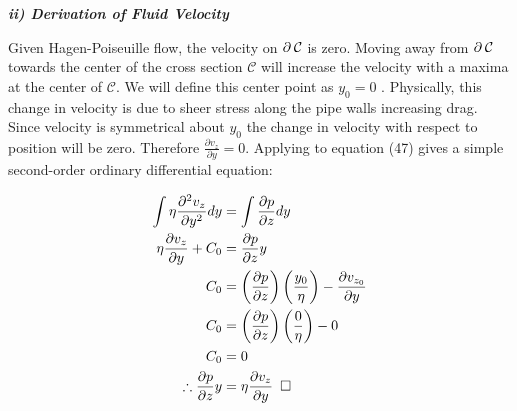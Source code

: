 \documentclass[titlepage]{article}
\begin{document}
\begin{center}
    \textbf{\emph{ii) Derivation of Fluid Velocity}}
\end{center}

\noindent \noindent Given Hagen-Poiseuille flow, the velocity on $\partial\hspace*{2pt}\mathcal{C}$ is zero. Moving away from $\partial\hspace*{2pt}\mathcal{C}$ towards the center of the cross section $\mathcal{C}$ will increase the velocity with a maxima at the center of $\mathcal{C}$. We will define this center point as $y_{0}=0$ . Physically, this change in velocity is due to sheer stress along the pipe walls increasing drag. Since velocity is symmetrical about $y_{0}$ the change in velocity with respect to position will be zero. Therefore  $\displaystyle\frac{\partial{v_{z}}}{\partial{y}} = 0$. Applying to equation (47) gives a simple second-order ordinary differential equation:

\begingroup
    \addtolength\jot{6pt}
    \begin{align}
        \int{\eta\displaystyle\frac{\partial^2{v_{z}}}{\partial{y}^2}dy}&=\int{\displaystyle\frac{\partial{p}}{\partial{z}}dy}\\
        \eta\displaystyle\frac{\partial{v_{z}}}{\partial{y}} + C_{0}&=\displaystyle\frac{\partial{p}}{\partial{z}}y \\
        C_{0} &=  \left(\displaystyle\frac{\partial{p}}{\partial{z}}\right)\left(\displaystyle\frac{y_{0}}{\eta}\right) - \displaystyle\frac{\partial{v_{z_{0}}}}{\partial{y}} \\
        C_{0} &=  \left(\displaystyle\frac{\partial{p}}{\partial{z}}\right)\left(\displaystyle\frac{0}{\eta}\right) - 0 \\
        C_{0} &=  0 \\
        \therefore \displaystyle\frac{\partial{p}}{\partial{z}}y&=\eta\displaystyle\frac{\partial{v_{z}}}{\partial{y}} \hspace*{5pt}\square 
    \end{align}
    
\end{document}
